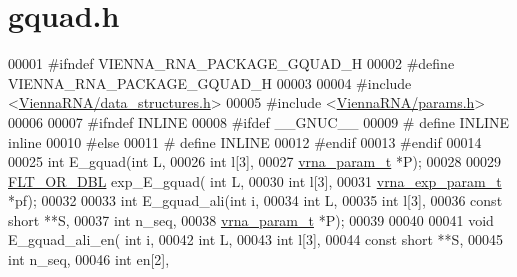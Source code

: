 \hypertarget{gquad_8h_source}{}\section{gquad.\+h}
\label{gquad_8h_source}

\begin{DoxyCode}
00001 \textcolor{preprocessor}{#ifndef VIENNA\_RNA\_PACKAGE\_GQUAD\_H}
00002 \textcolor{preprocessor}{#define VIENNA\_RNA\_PACKAGE\_GQUAD\_H}
00003 
00004 \textcolor{preprocessor}{#include <\hyperlink{data__structures_8h}{ViennaRNA/data\_structures.h}>}
00005 \textcolor{preprocessor}{#include <\hyperlink{params_8h}{ViennaRNA/params.h}>}
00006 
00007 \textcolor{preprocessor}{#ifndef INLINE}
00008 \textcolor{preprocessor}{#ifdef \_\_GNUC\_\_}
00009 \textcolor{preprocessor}{# define INLINE inline}
00010 \textcolor{preprocessor}{#else}
00011 \textcolor{preprocessor}{# define INLINE}
00012 \textcolor{preprocessor}{#endif}
00013 \textcolor{preprocessor}{#endif}
00014 
00025 \textcolor{keywordtype}{int}         E\_gquad(\textcolor{keywordtype}{int} L,
00026                     \textcolor{keywordtype}{int} l[3],
00027                     \hyperlink{group__energy__parameters_structvrna__param__s}{vrna\_param\_t} *P);
00028 
00029 \hyperlink{group__data__structures_ga31125aeace516926bf7f251f759b6126}{FLT\_OR\_DBL} exp\_E\_gquad( \textcolor{keywordtype}{int} L,
00030                         \textcolor{keywordtype}{int} l[3],
00031                         \hyperlink{group__energy__parameters_structvrna__exp__param__s}{vrna\_exp\_param\_t} *pf);
00032 
00033 \textcolor{keywordtype}{int}         E\_gquad\_ali(\textcolor{keywordtype}{int} i,
00034                         \textcolor{keywordtype}{int} L,
00035                         \textcolor{keywordtype}{int} l[3],
00036                         \textcolor{keyword}{const} \textcolor{keywordtype}{short} **S,
00037                         \textcolor{keywordtype}{int} n\_seq,
00038                         \hyperlink{group__energy__parameters_structvrna__param__s}{vrna\_param\_t} *P);
00039 
00040 
00041 \textcolor{keywordtype}{void}        E\_gquad\_ali\_en( \textcolor{keywordtype}{int} i,
00042                             \textcolor{keywordtype}{int} L,
00043                             \textcolor{keywordtype}{int} l[3],
00044                             \textcolor{keyword}{const} \textcolor{keywordtype}{short} **S,
00045                             \textcolor{keywordtype}{int} n\_seq,
00046                             \textcolor{keywordtype}{int} en[2],

\end{DoxyCode}
